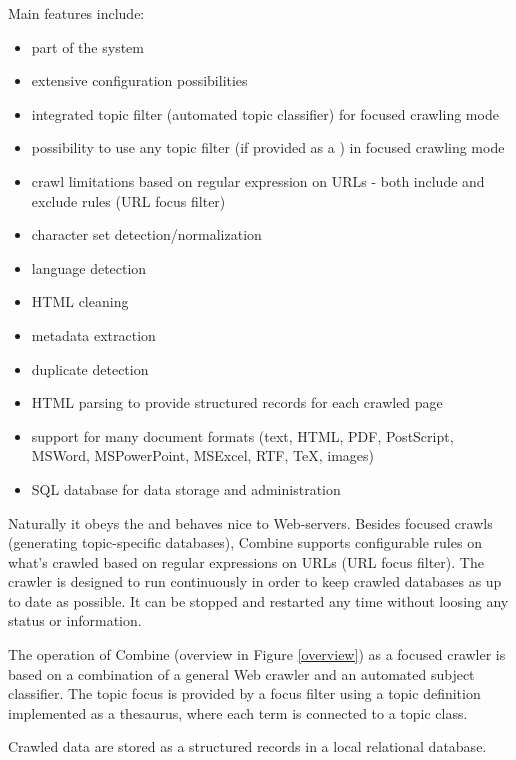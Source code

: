 \hspace{-\parindent}Main features include:
\begin{itemize}
\item part of the  system
\item extensive configuration possibilities
\item integrated topic filter (automated topic classifier) for focused crawling mode
\item possibility to use any topic filter (if provided as a ) in focused crawling mode
\item crawl limitations based on regular expression on URLs -
both include and exclude rules (URL focus filter)
\item character set detection/normalization
\item language detection
\item HTML cleaning
\item metadata extraction
\item duplicate detection
\item HTML parsing to provide structured records for each crawled page
\item support for many document formats (text, HTML, PDF, PostScript, MSWord, MSPowerPoint, MSExcel, RTF, TeX, images)
\item SQL database for data storage and administration
\end{itemize}

Naturally it obeys the 
and behaves nice to Web-servers. Besides focused crawls (generating
topic-specific databases), Combine supports configurable rules on
what's crawled based on regular expressions on URLs (URL focus filter).
The crawler is designed to run continuously in order to keep
crawled databases as up to date as possible. It can be stopped and
restarted any time without loosing any status or information.

The operation of Combine (overview in Figure \ref{overview}) as a focused crawler is based on a combination of a
general Web crawler and an automated subject classifier. The topic
focus is provided by a focus filter using a topic
definition implemented as a thesaurus, where each term is connected to a
topic class.

Crawled data are stored as a
structured records in a local relational database.

